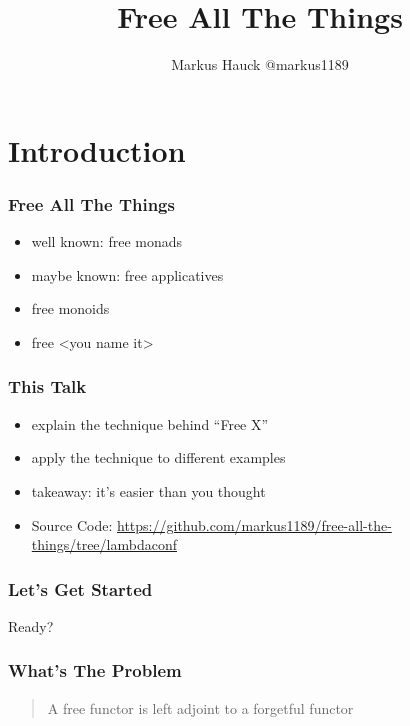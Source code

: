 \documentclass{beamer}
\title{Free All The Things}
\author{Markus Hauck @markus1189}
\begin{document}
\begin{frame}
  \titlepage{}
\end{frame}

\section{Introduction}\label{sec:introduction}

\begin{frame}
\frametitle{Free All The Things}
\begin{itemize}
\item well known: free monads
\item maybe known: free applicatives
\item free monoids
\item free <you name it>
\end{itemize}
\end{frame}

\begin{frame}
  \frametitle{This Talk}
  \begin{itemize}
  \item explain the technique behind ``Free X''
  \item apply the technique to different examples
  \item takeaway: it's easier than you thought
  \item Source Code: \url{https://github.com/markus1189/free-all-the-things/tree/lambdaconf}
  \end{itemize}
\end{frame}

\begin{frame}
  \frametitle{Let's Get Started}
  \begin{center}
    Ready?
  \end{center}
\end{frame}

\begin{frame}
  \frametitle{What's The Problem}
  \begin{quote}
    A free functor is left adjoint to a forgetful functor
  \end{quote}
\end{frame}
\end{document}

